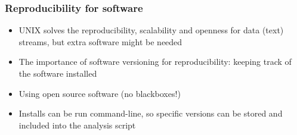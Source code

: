 \documentclass{beamer}
\begin{document}





\begin{frame}
\frametitle{Reproducibility for software}
\begin{itemize}
\item UNIX solves the reproducibility, scalability and openness for data (text) streams, but extra software might be needed
\item The importance of software versioning for reproducibility: keeping track of the software installed
\item Using open source software (no blackboxes!)
\item Installs can be run command-line, so specific versions can be stored and included into the analysis script
\end{itemize}
  
\end{frame}







\end{document}
